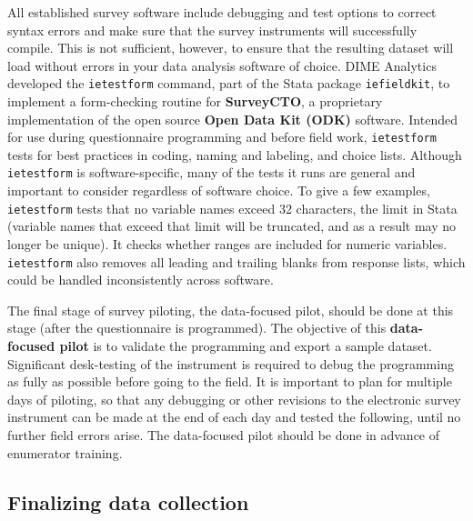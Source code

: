 All established survey software include debugging and test options
to correct syntax errors and make sure that
the survey instruments will successfully compile.
This is not sufficient, however, to ensure that the resulting dataset
will load without errors in your data analysis software of choice.
DIME Analytics developed the \texttt{ietestform} command,
part of the Stata package \texttt{iefieldkit},
to implement a form-checking routine for \textbf{SurveyCTO},
a proprietary implementation of the open source \textbf{Open Data Kit (ODK)} software.
Intended for use during questionnaire programming and before field work,
\texttt{ietestform} tests for best practices
in coding, naming and labeling, and choice lists.
Although \texttt{ietestform} is software-specific,
many of the tests it runs are general and important to consider regardless of software choice.
To give a few examples, \texttt{ietestform} tests that no variable names exceed
32 characters, the limit in Stata (variable names that exceed that limit will
be truncated, and as a result may no longer be unique).
It checks whether ranges are included for numeric variables.
\texttt{ietestform} also removes all leading and trailing blanks from response lists,
which could be handled inconsistently across software.

The final stage of survey piloting, the data-focused pilot, should be done at this stage (after the questionnaire is programmed).
The objective of this \textbf{data-focused pilot}
is to validate the programming and export a sample dataset.
Significant desk-testing of the instrument is required to debug the programming
as fully as possible before going to the field.
It is important to plan for multiple days of piloting,
so that any debugging or other revisions to the electronic survey instrument
can be made at the end of each day and tested the following, until no further field errors arise.
The data-focused pilot should be done in advance of enumerator training.

\subsection{Finalizing data collection}

